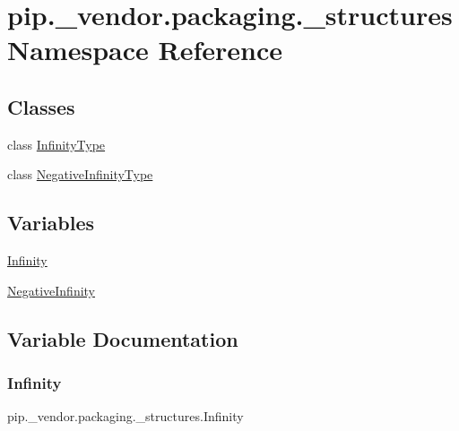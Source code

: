 \hypertarget{namespacepip_1_1__vendor_1_1packaging_1_1__structures}{}\section{pip.\+\_\+vendor.\+packaging.\+\_\+structures Namespace Reference}
\label{namespacepip_1_1__vendor_1_1packaging_1_1__structures}
\subsection*{Classes}
\begin{DoxyCompactItemize}
\item 
class \hyperlink{classpip_1_1__vendor_1_1packaging_1_1__structures_1_1InfinityType}{Infinity\+Type}
\item 
class \hyperlink{classpip_1_1__vendor_1_1packaging_1_1__structures_1_1NegativeInfinityType}{Negative\+Infinity\+Type}
\end{DoxyCompactItemize}
\subsection*{Variables}
\begin{DoxyCompactItemize}
\item 
\hyperlink{namespacepip_1_1__vendor_1_1packaging_1_1__structures_ad41b55edf0b39ae67559f94e6bc93342}{Infinity}
\item 
\hyperlink{namespacepip_1_1__vendor_1_1packaging_1_1__structures_ab8e0d8e763c1859302c3685652e10437}{Negative\+Infinity}
\end{DoxyCompactItemize}


\subsection{Variable Documentation}
\mbox{\label{namespacepip_1_1__vendor_1_1packaging_1_1__structures_ad41b55edf0b39ae67559f94e6bc93342}} 
\subsubsection{\texorpdfstring{Infinity}{Infinity}}
{\footnotesize\ttfamily pip.\+\_\+vendor.\+packaging.\+\_\+structures.\+Infinity}

